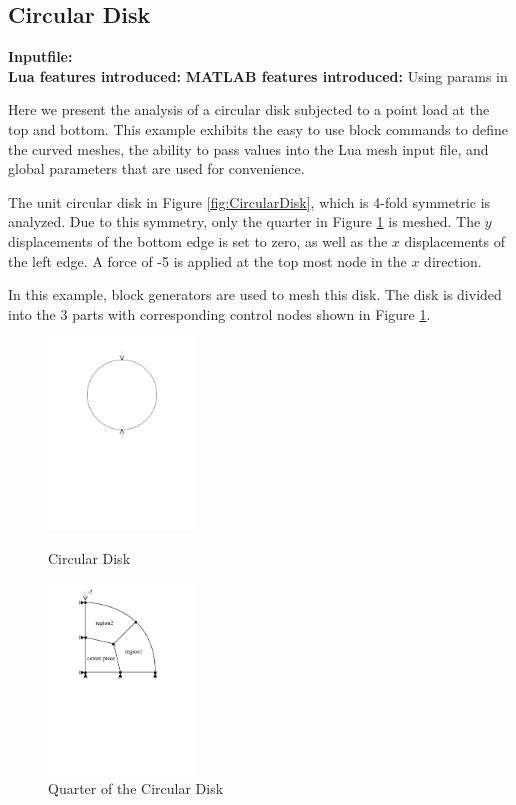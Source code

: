 \clearpage
\subsection{Circular Disk}
\begin{flushleft}
  \textbf{Inputfile:}
  \\
  \textbf{Lua features introduced:}
  \textbf{MATLAB features introduced:}
  Using params in 
\end{flushleft}
Here we present the analysis of a circular disk subjected
to a point load at the top and bottom. This example exhibits
the easy to use block commands to define the curved meshes,
the ability to pass values into the Lua mesh input file, and 
global parameters that are used for convenience. 

The unit circular disk in Figure \ref{fig:CircularDisk}, which
is 4-fold symmetric is analyzed. Due to this symmetry, only
the quarter in Figure \ref{fig:CircularDiskQuarter} is meshed.
The $y$ displacements of the bottom edge is set to zero, as well as
the $x$ displacements of the left edge. A force of -5 is applied
at the top most node in the $x$ direction. 

In this example, block generators are used  to mesh this disk.
The disk is divided into the 3 parts with corresponding control
nodes shown in Figure \ref{fig:CircularDiskQuarter}.

\begin{figure}[htbp]
  \begin{minipage}{0.45\linewidth}
    \centering
    \includegraphics[trim = 1in 5in 1in 0cm, clip, height=2in]{fig/circulardisk.pdf}
    \caption{Circular Disk}
    \label{fig:CircularDisk}
  \end{minipage}
  \begin{minipage}{0.45\linewidth}
    \centering
    \includegraphics[trim = 0.5in 5in 0.5in 0cm, clip, height=2in]{fig/circulardiskquarter.pdf}
    \caption{Quarter of the Circular Disk}
    \label{fig:CircularDiskQuarter}
  \end{minipage}
\end{figure}

